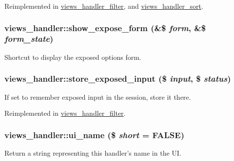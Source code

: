 Reimplemented in \hyperlink{classviews__handler__filter_afa388297472d32d4bcb976bf3515d16a}{views\_\-handler\_\-filter}, and \hyperlink{classviews__handler__sort_a1058d93ad14e1417c093a8716113be60}{views\_\-handler\_\-sort}.\hypertarget{classviews__handler_ad2be656c724d87d3b9f9c66392ab88f9}{
\subsubsection[{show\_\-expose\_\-form}]{\setlength{\rightskip}{0pt plus 5cm}views\_\-handler::show\_\-expose\_\-form (\&\$ {\em form}, \/  \&\$ {\em form\_\-state})}}
\label{classviews__handler_ad2be656c724d87d3b9f9c66392ab88f9}
Shortcut to display the exposed options form. \hypertarget{classviews__handler_a7f2453d86d3cb3850826e8c921012f16}{
\subsubsection[{store\_\-exposed\_\-input}]{\setlength{\rightskip}{0pt plus 5cm}views\_\-handler::store\_\-exposed\_\-input (\$ {\em input}, \/  \$ {\em status})}}
\label{classviews__handler_a7f2453d86d3cb3850826e8c921012f16}
If set to remember exposed input in the session, store it there. 

Reimplemented in \hyperlink{classviews__handler__filter_a7ad1d1cd56293ca452be9e7d5cfd8b94}{views\_\-handler\_\-filter}.\hypertarget{classviews__handler_ae81019ed08d9c3f5bca3d16c69e7b39f}{
\subsubsection[{ui\_\-name}]{\setlength{\rightskip}{0pt plus 5cm}views\_\-handler::ui\_\-name (\$ {\em short} = {\ttfamily FALSE})}}
\label{classviews__handler_ae81019ed08d9c3f5bca3d16c69e7b39f}
Return a string representing this handler's name in the UI. 

